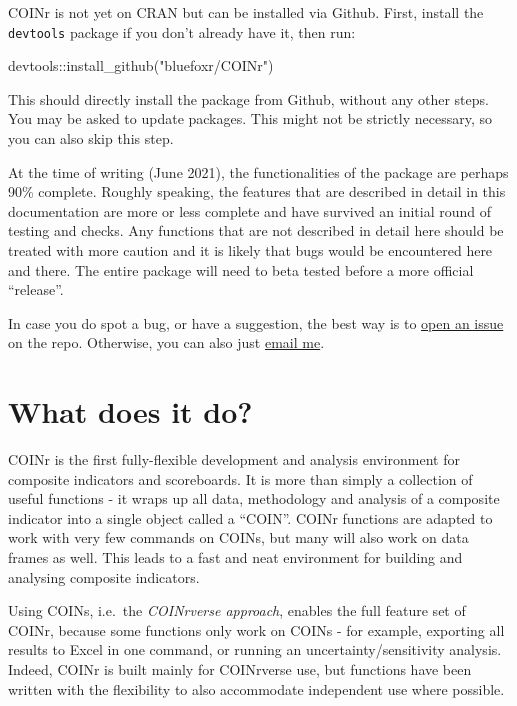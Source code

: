 \documentclass[
]{book}
\newenvironment{Shaded}{\begin{snugshade}}{\end{snugshade}}
\newcommand{\FunctionTok}[1]{\textcolor[rgb]{0.00,0.00,0.00}{#1}}
\newcommand{\NormalTok}[1]{#1}
\newcommand{\SpecialCharTok}[1]{\textcolor[rgb]{0.00,0.00,0.00}{#1}}
\newcommand{\StringTok}[1]{\textcolor[rgb]{0.31,0.60,0.02}{#1}}
\begin{document}
COINr is not yet on CRAN but can be installed via Github. First, install the \texttt{devtools} package if you don't already have it, then run:

\begin{Shaded}
\begin{Highlighting}[]
\NormalTok{devtools}\SpecialCharTok{::}\FunctionTok{install\_github}\NormalTok{(}\StringTok{"bluefoxr/COINr"}\NormalTok{)}
\end{Highlighting}
\end{Shaded}

This should directly install the package from Github, without any other steps. You may be asked to update packages. This might not be strictly necessary, so you can also skip this step.

At the time of writing (June 2021), the functionalities of the package are perhaps 90\% complete. Roughly speaking, the features that are described in detail in this documentation are more or less complete and have survived an initial round of testing and checks. Any functions that are not described in detail here should be treated with more caution and it is likely that bugs would be encountered here and there. The entire package will need to beta tested before a more official ``release''.

In case you do spot a bug, or have a suggestion, the best way is to \href{https://github.com/bluefoxr/COINr/issues}{open an issue} on the repo. Otherwise, you can also just \href{mailto:william.becker@bluefoxdata.eu}{email me}.

\hypertarget{what-does-it-do}{%
\section{What does it do?}\label{what-does-it-do}}

COINr is the first fully-flexible development and analysis environment for composite indicators and scoreboards. It is more than simply a collection of useful functions - it wraps up all data, methodology and analysis of a composite indicator into a single object called a ``COIN''. COINr functions are adapted to work with very few commands on COINs, but many will also work on data frames as well. This leads to a fast and neat environment for building and analysing composite indicators.

Using COINs, i.e.~the \emph{COINrverse approach}, enables the full feature set of COINr, because some functions only work on COINs - for example, exporting all results to Excel in one command, or running an uncertainty/sensitivity analysis. Indeed, COINr is built mainly for COINrverse use, but functions have been written with the flexibility to also accommodate independent use where possible.
\end{document}
